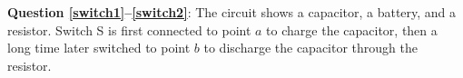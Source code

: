 \documentclass{../../../oss-apphys-exam}
\begin{document}

  
%  
  
\textbf{Question \ref{switch1}--\ref{switch2}}: The circuit shows a
capacitor, a battery, and a resistor. Switch S is first connected to point
$a$ to charge the capacitor, then a long time later switched to point $b$ to
discharge the capacitor through the resistor.
\begin{center}
\end{center}
\end{document}
